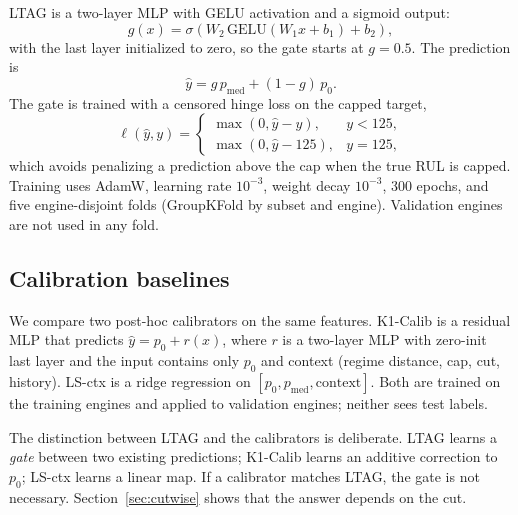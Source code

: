 LTAG is a two-layer MLP with GELU activation and a sigmoid output:
\begin{equation}
g(x)=\sigma\!\left(W_2\,\mathrm{GELU}(W_1 x+b_1)+b_2\right),
\end{equation}
with the last layer initialized to zero, so the gate starts at $g=0.5$. The
prediction is
\begin{equation}
\hat y = g\,p_{\mathrm{med}} + (1-g)\,p_0 .
\label{eq:gate}
\end{equation}
The gate is trained with a censored hinge loss on the capped target,
\begin{equation}
\ell(\hat y,y)=
\begin{cases}
\max(0,\hat y-y), & y<125,\\
\max(0,\hat y-125), & y=125,
\end{cases}
\end{equation}
which avoids penalizing a prediction above the cap when the true RUL is capped.
Training uses AdamW, learning rate $10^{-3}$, weight decay $10^{-3}$, 300 epochs,
and five engine-disjoint folds (GroupKFold by subset and engine). Validation
engines are not used in any fold.

\subsection{Calibration baselines}

We compare two post-hoc calibrators on the same features. K1-Calib is a residual
MLP that predicts $\hat y=p_0+r(x)$, where $r$ is a two-layer MLP with zero-init
last layer and the input contains only $p_0$ and context (regime distance, cap,
cut, history). LS-ctx is a ridge regression on
$[p_0,p_{\mathrm{med}},\text{context}]$. Both are trained on the training engines
and applied to validation engines; neither sees test labels.

The distinction between LTAG and the calibrators is deliberate. LTAG learns a
\emph{gate} between two existing predictions; K1-Calib learns an additive
correction to $p_0$; LS-ctx learns a linear map. If a calibrator matches LTAG,
the gate is not necessary. Section~\ref{sec:cutwise} shows that the answer
depends on the cut.
